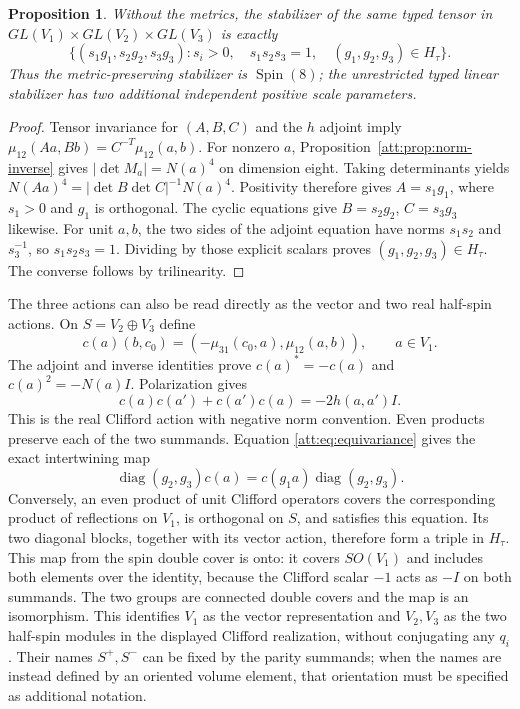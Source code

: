 \documentclass[11pt]{article}
\newtheorem{proposition}[theorem]{Proposition}
\theoremstyle{definition}
\begin{document}
\begin{proposition}\label{att:prop:linear-stabilizer}
Without the metrics, the stabilizer of the same typed tensor in
$GL(V_1)\times GL(V_2)\times GL(V_3)$ is exactly
\[
 \{(s_1g_1,s_2g_2,s_3g_3):s_i>0,\quad s_1s_2s_3=1,\quad
                          (g_1,g_2,g_3)\in H_\tau\}.
\]
Thus the metric-preserving stabilizer is $\operatorname{Spin}(8)$;
the unrestricted typed linear stabilizer has two additional
independent positive scale parameters.
\end{proposition}

\begin{proof}
Tensor invariance for $(A,B,C)$ and the $h$ adjoint imply
$\mu_{12}(Aa,Bb)=C^{-T}\mu_{12}(a,b)$.
For nonzero $a$, Proposition~\ref{att:prop:norm-inverse} gives
$|\det M_a|=N(a)^4$ on dimension eight. Taking determinants yields
$N(Aa)^4=|\det B\det C|^{-1}N(a)^4$. Positivity therefore gives
$A=s_1g_1$, where $s_1>0$ and $g_1$ is orthogonal. The cyclic equations
give $B=s_2g_2$, $C=s_3g_3$ likewise. For unit $a,b$, the two sides
of the adjoint equation have norms $s_1s_2$ and $s_3^{-1}$, so
$s_1s_2s_3=1$. Dividing by those explicit scalars proves
$(g_1,g_2,g_3)\in H_\tau$. The converse follows by trilinearity.
\end{proof}

The three actions can also be read directly as the vector and two
real half-spin actions. On $S=V_2\oplus V_3$ define
\begin{equation}
 c(a)(b,c_0)=(-\mu_{31}(c_0,a),\mu_{12}(a,b)),\qquad a\in V_1.
 \label{att:eq:clifford}
\end{equation}
The adjoint and inverse identities prove
$c(a)^*=-c(a)$ and $c(a)^2=-N(a)I$. Polarization gives
\[
 c(a)c(a')+c(a')c(a)=-2h(a,a')I.
\]
This is the real Clifford action with negative norm convention.
Even products preserve each of the two summands.
Equation \eqref{att:eq:equivariance} gives the exact intertwining map
\[
 \operatorname{diag}(g_2,g_3)c(a)
 =c(g_1a)\operatorname{diag}(g_2,g_3).
\]
Conversely, an even product of unit Clifford operators covers the
corresponding product of reflections on $V_1$, is orthogonal on $S$,
and satisfies this equation. Its two diagonal blocks, together with
its vector action, therefore form a triple in $H_\tau$. This map
from the spin double cover is onto: it covers $SO(V_1)$ and includes
both elements over the identity, because the Clifford scalar $-1$
acts as $-I$ on both summands. The two groups are connected double
covers and the map is an isomorphism. This identifies $V_1$ as the
vector representation and $V_2,V_3$ as the two half-spin modules in
the displayed Clifford realization, without conjugating any $q_i$.
Their names $S^+,S^-$ can be fixed by the parity summands; when the
names are instead defined by an oriented volume element, that
orientation must be specified as additional notation.
\end{document}
